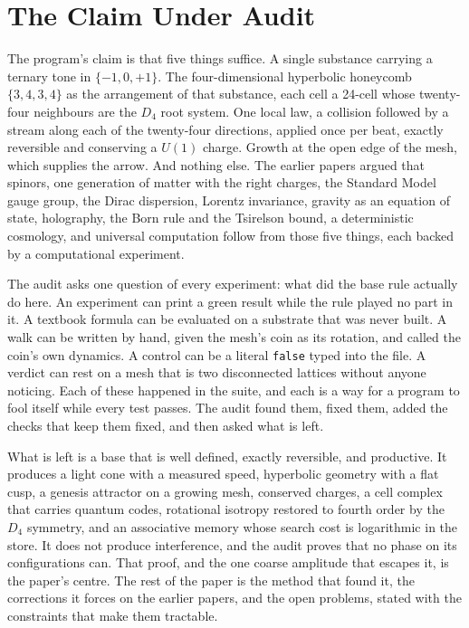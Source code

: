 \section{The Claim Under Audit}

The program's claim is that five things suffice. A single substance carrying a ternary tone in $\{-1, 0, +1\}$. The
four-dimensional hyperbolic honeycomb $\{3,4,3,4\}$ as the arrangement of that substance, each cell a 24-cell whose
twenty-four neighbours are the $D_4$ root system. One local law, a collision followed by a stream along each of the
twenty-four directions, applied once per beat, exactly reversible and conserving a $U(1)$ charge. Growth at the open
edge of the mesh, which supplies the arrow. And nothing else. The earlier papers \cite{pollard2026discrete,
pollard2026nothing} argued that spinors, one generation of matter with the right charges, the Standard Model gauge
group, the Dirac dispersion, Lorentz invariance, gravity as an equation of state, holography, the Born rule and the
Tsirelson bound, a deterministic cosmology, and universal computation follow from those five things, each backed by
a computational experiment.

The audit asks one question of every experiment: what did the base rule actually do here. An experiment can print a
green result while the rule played no part in it. A textbook formula can be evaluated on a substrate that was never
built. A walk can be written by hand, given the mesh's coin as its rotation, and called the coin's own dynamics. A
control can be a literal \texttt{false} typed into the file. A verdict can rest on a mesh that is two disconnected
lattices without anyone noticing. Each of these happened in the suite, and each is a way for a program to fool
itself while every test passes. The audit found them, fixed them, added the checks that keep them fixed, and then
asked what is left.

What is left is a base that is well defined, exactly reversible, and productive. It produces a light cone with a
measured speed, hyperbolic geometry with a flat cusp, a genesis attractor on a growing mesh, conserved charges, a
cell complex that carries quantum codes, rotational isotropy restored to fourth order by the $D_4$ symmetry, and an
associative memory whose search cost is logarithmic in the store. It does not produce interference, and the audit
proves that no phase on its configurations can. That proof, and the one coarse amplitude that escapes it, is the
paper's centre. The rest of the paper is the method that found it, the corrections it forces on the earlier papers,
and the open problems, stated with the constraints that make them tractable.
